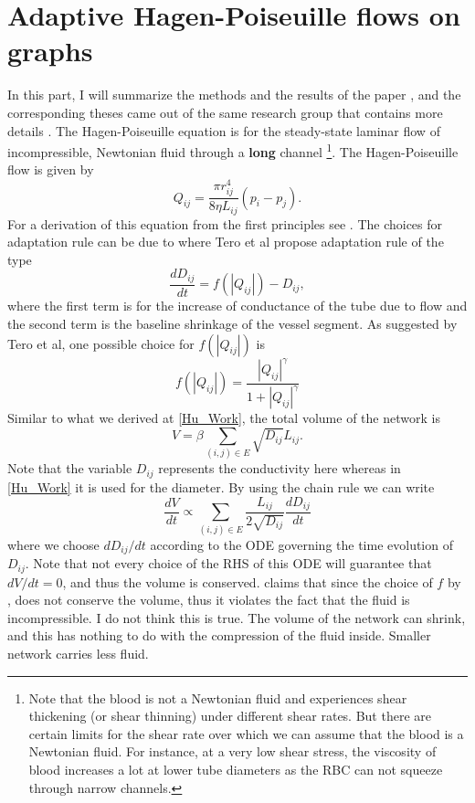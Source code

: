 \documentclass[10pt,a4paper,twocolumn]{article}
\begin{document}
	\section{Adaptive Hagen-Poiseuille flows on graphs}
	In this part, I will summarize the methods and the results of the paper \cite{Almeida2022}, and the corresponding theses came out of the same research group that contains more details \cite{Valente2023,Almeida2023}. The Hagen-Poiseuille equation is for the steady-state laminar flow of incompressible, Newtonian fluid through a \textbf{long} channel \footnote{Note that the blood is not a Newtonian fluid and experiences shear thickening (or shear thinning) under different shear rates. But there are certain limits for the shear rate over which we can assume that the blood is a Newtonian fluid. For instance, at a very low shear stress, the viscosity of blood increases a lot at lower tube diameters as the RBC can not squeeze through narrow channels.}. The Hagen-Poiseuille flow is given by
	\[ Q_{ij} = \frac{\pi r_{ij}^4}{8\eta L_{ij}}(p_i - p_j). \]
	For a derivation of this equation from the first principles see \cite{tecscience2020}. The choices for adaptation rule can be due to \cite{Tero2010} where Tero et al propose adaptation rule of the type
	\[ \frac{d D_{ij}}{dt} = f(|Q_{ij}|) - D_{ij}, \]
	where the first term is for the increase of conductance of the tube due to flow and the second term is the baseline shrinkage of the vessel segment. As suggested by Tero et al, one possible choice for $ f(|Q_{ij}|) $ is 
	\[ f(|Q_{ij}|) = \frac{|Q_{ij}|^\gamma}{1+|Q_{ij}|^\gamma} \]
	Similar to what we derived at \autoref{Hu_Work}, the total volume of the network is
	\[ V = \beta \sum_{(i,j)\in E} \sqrt{D_{ij}}L_{ij}. \]
	Note that the variable $ D_{ij} $ represents the conductivity here whereas in \autoref{Hu_Work} it is used for the diameter. By using the chain rule we can write
	\[ \frac{d V}{dt} \propto \sum_{(i,j)\in E} \frac{L_{ij}}{2\sqrt{D_{ij}}} \frac{dD_{ij}}{dt} \]
	where we choose $ d D_{ij}/dt $ according to the ODE governing the time evolution of $ D_{ij} $. Note that not every choice of the RHS of this ODE will guarantee that $ dV/dt = 0 $, and thus the volume is conserved. \cite{Almeida2023} claims that since the choice of $ f $ by \cite{Tero2010}, does not conserve the volume, thus it violates the fact that the fluid is incompressible. I do not think this is true. The volume of the network can shrink, and this has nothing to do with the compression of the fluid inside. Smaller network carries less fluid.
	
\end{document}
